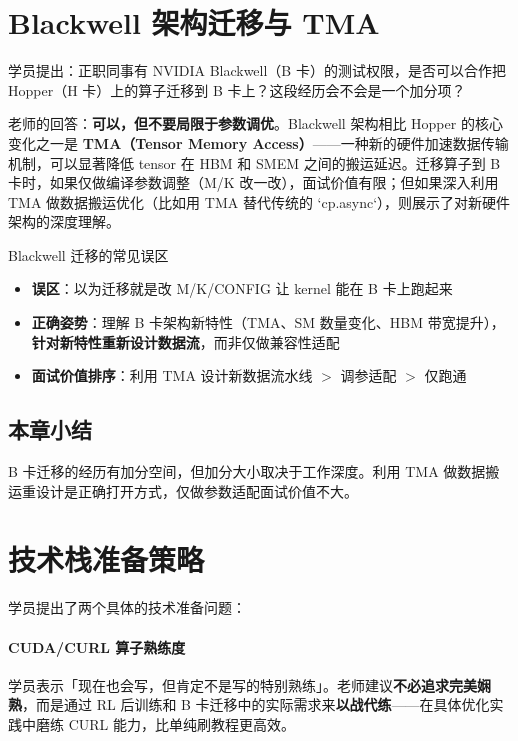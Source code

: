 \documentclass[a4paper]{article}
\begin{document}
\clearpage

\section{Blackwell 架构迁移与 TMA}

学员提出：正职同事有 NVIDIA Blackwell（B 卡）的测试权限，是否可以合作把 Hopper（H 卡）上的算子迁移到 B 卡上？这段经历会不会是一个加分项？

老师的回答：\textbf{可以，但不要局限于参数调优}。Blackwell 架构相比 Hopper 的核心变化之一是 \textbf{TMA（Tensor Memory Access）}——一种新的硬件加速数据传输机制，可以显著降低 tensor 在 HBM 和 SMEM 之间的搬运延迟。迁移算子到 B 卡时，如果仅做编译参数调整（M/K 改一改），面试价值有限；但如果深入利用 TMA 做数据搬运优化（比如用 TMA 替代传统的 `cp.async`），则展示了对新硬件架构的深度理解。

\begin{warningbox}{Blackwell 迁移的常见误区}
\begin{itemize}
\item \textbf{误区}：以为迁移就是改 M/K/CONFIG 让 kernel 能在 B 卡上跑起来
\item \textbf{正确姿势}：理解 B 卡架构新特性（TMA、SM 数量变化、HBM 带宽提升），\textbf{针对新特性重新设计数据流}，而非仅做兼容性适配
\item \textbf{面试价值排序}：利用 TMA 设计新数据流水线 $>$ 调参适配 $>$ 仅跑通
\end{itemize}
\end{warningbox}

\subsection{本章小结}
B 卡迁移的经历有加分空间，但加分大小取决于工作深度。利用 TMA 做数据搬运重设计是正确打开方式，仅做参数适配面试价值不大。

\section{技术栈准备策略}

学员提出了两个具体的技术准备问题：

\paragraph{CUDA/CURL 算子熟练度}学员表示「现在也会写，但肯定不是写的特别熟练」。老师建议\textbf{不必追求完美娴熟}，而是通过 RL 后训练和 B 卡迁移中的实际需求来\textbf{以战代练}——在具体优化实践中磨练 CURL 能力，比单纯刷教程更高效。
\end{document}
